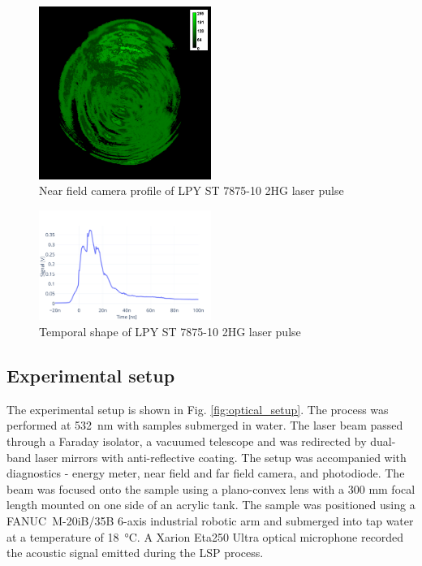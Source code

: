 \documentclass[sn-nature]{sn-jnl}%
\theoremstyle{thmstyleone}%
\theoremstyle{thmstyletwo}%
\theoremstyle{thmstylethree}%
\begin{document}
    \begin{figure}[h!]     
    \centering
    \includegraphics[width=0.5\textwidth]{C2-v3_36_mJ_scale.png}
    \caption{Near field camera profile of LPY ST 7875-10 2HG laser pulse}
    \label{fig:profile}
    \end{figure}


    \begin{figure}[h!]     
    \centering
    \includegraphics[width=0.5\textwidth]{temporal_profile_new.png}
    \caption{Temporal shape of LPY ST 7875-10 2HG laser pulse}
    \label{fig:temporal}
    \end{figure}


    \subsection{Experimental setup}

    The experimental setup is shown in Fig. \ref{fig:optical_setup}. The process was performed at \SI{532}{\nano\meter} with samples submerged in water. The laser beam passed through a Faraday isolator, a vacuumed telescope and was redirected by dual-band laser mirrors with anti-reflective coating. The setup was accompanied with diagnostics - energy meter, near field and far field camera, and photodiode. The beam was focused onto the sample using a plano-convex lens with a 300 mm focal length mounted on one side of an acrylic tank. The sample was positioned using a FANUC~M-20iB/35B 6-axis industrial robotic arm and submerged into tap water at a temperature of \SI{18}{\celsius}. A Xarion Eta250 Ultra optical microphone recorded the acoustic signal emitted during the LSP process.
\end{document}

